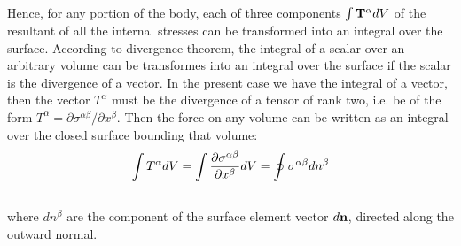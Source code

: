 \documentclass[letterpaper,10pt,english]{sphinxmanual}
\begin{document}
Hence, for any portion of the body, each of three components $\int {\bf T^{\alpha}}dV$ of the resultant of all the internal stresses can be transformed into an integral over the surface. According to divergence theorem, the integral of a scalar over an arbitrary volume can be transformes into an integral over the surface  if the scalar is the divergence of a vector. In the present case we have the integral of a vector, then the vector $T^{\alpha}$ must be the divergence of a tensor of rank two, i.e. be of the form $T^{\alpha}={\partial \sigma^{\alpha\beta}}/{\partial x^{\beta}}$. Then the force on any volume can be written as an integral over the closed surface bounding that volume:
\label{general:equation-eqstress1}\begin{gather}
\begin{split}\int {T^{\alpha} dV} = \int{\frac{\partial \sigma^{\alpha\beta}}{\partial x^{\beta}} dV} = \oint{\sigma^{\alpha\beta} dn^{\beta}}\end{split}\label{general-eqstress1}\\\begin{split}\end{split}\notag
\end{gather}
where $dn^{\beta}$ are the component of the surface element vector $d{\bf n}$, directed along the outward normal.
\end{document}
